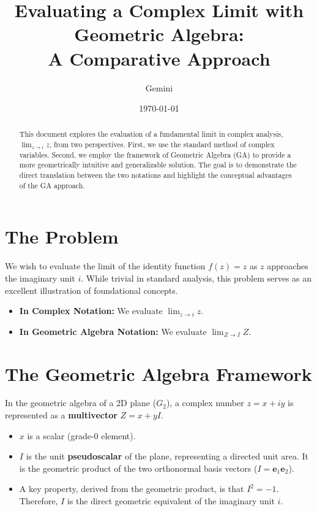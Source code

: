 \documentclass[11pt, a4paper]{article}
\title{Evaluating a Complex Limit with Geometric Algebra: \\ A Comparative Approach}
\author{Gemini}
\date{\today}
\begin{document}
\maketitle

\begin{abstract}
This document explores the evaluation of a fundamental limit in complex analysis, $\lim_{z \to i} z$, from two perspectives. First, we use the standard method of complex variables. Second, we employ the framework of Geometric Algebra (GA) to provide a more geometrically intuitive and generalizable solution. The goal is to demonstrate the direct translation between the two notations and highlight the conceptual advantages of the GA approach.
\end{abstract}

\section{The Problem}
We wish to evaluate the limit of the identity function $f(z)=z$ as $z$ approaches the imaginary unit $i$. While trivial in standard analysis, this problem serves as an excellent illustration of foundational concepts.
\begin{itemize}
    \item \textbf{In Complex Notation:} We evaluate $\lim_{z \to i} z$.
    \item \textbf{In Geometric Algebra Notation:} We evaluate $\lim_{Z \to I} Z$.
\end{itemize}

\section{The Geometric Algebra Framework}
In the geometric algebra of a 2D plane ($G_2$), a complex number $z = x + iy$ is represented as a \textbf{multivector} $Z = x + yI$.
\begin{itemize}
    \item $x$ is a scalar (grade-0 element).
    \item $I$ is the unit \textbf{pseudoscalar} of the plane, representing a directed unit area. It is the geometric product of the two orthonormal basis vectors ($I = \mathbf{e}_1\mathbf{e}_2$).
    \item A key property, derived from the geometric product, is that $I^2 = -1$. Therefore, $I$ is the direct geometric equivalent of the imaginary unit $i$.
\end{itemize}
\end{document}
